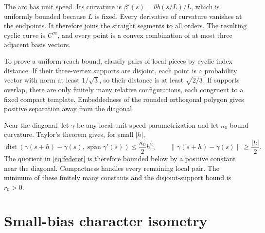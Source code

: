 \documentclass{article}
\theoremstyle{definition}
\theoremstyle{remark}
\newcommand{\1}{\mathbf 1}
\newcommand{\dist}{\operatorname{dist}}
\begin{document}
The arc has unit speed. Its curvature is $\beta'(s)=\theta b(s/L)/L$, which is uniformly bounded because $L$ is fixed. Every derivative of curvature vanishes at the endpoints. It therefore joins the straight segments to all orders. The resulting cyclic curve is $C^\infty$, and every point is a convex combination of at most three adjacent basis vectors.

To prove a uniform reach bound, classify pairs of local pieces by cyclic index distance. If their three-vertex supports are disjoint, each point is a probability vector with norm at least $1/\sqrt3$, so their distance is at least $\sqrt{2/3}$. If supports overlap, there are only finitely many relative configurations, each congruent to a fixed compact template. Embeddedness of the rounded orthogonal polygon gives positive separation away from the diagonal.

Near the diagonal, let $\gamma$ be any local unit-speed parametrization and let $\kappa_0$ bound curvature. Taylor's theorem gives, for small $|h|$, \[ \dist(\gamma(s+h)-\gamma(s),\operatorname{span}\gamma'(s)) \leq\frac{\kappa_0}{2}h^2, \qquad \|\gamma(s+h)-\gamma(s)\|\geq\frac{|h|}{2}. \] The quotient in \eqref{eq:federer} is therefore bounded below by a positive constant near the diagonal. Compactness handles every remaining local pair. The minimum of these finitely many constants and the disjoint-support bound is $r_0>0$.

\section{Small-bias character isometry}
\label{app:rip}
\end{document}
